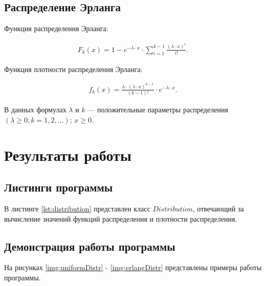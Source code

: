 \documentclass{bmstu}
\begin{document}
\section{Распределение Эрланга}

Функция распределения Эрланга:

\begin{equation}
    \begin{aligned}
        F_k(x) = 1 - e^{-\lambda \cdot x} \cdot \sum_{i = 1}^{k - 1} \frac{(\lambda \cdot x)^i}{i!}.
    \end{aligned}
\end{equation}


Функция плотности распределения Эрланга:

\begin{equation}
    \begin{aligned}
        f_k(x) = \frac{\lambda \cdot (\lambda \cdot x)^{k - 1}}{(k - 1)!} \cdot e^{-\lambda \cdot x}.
    \end{aligned}
\end{equation}

В данных формулах $\lambda$ и $k$ --- положительные параметры распределения $(\lambda \geqslant 0; k = 1, 2, ...)$;
$x \geqslant 0$.

\chapter{Результаты работы}

\section{Листинги программы}

В листинге \ref{lst:distribution} представлен класс $Distribution$, отвечающий за вычисление значений функций распределения и плотности распределения.


\section{Демонстрация работы программы}

На рисунках \ref{img:uniformDistr} - \ref{img:erlangDistr} представлены примеры работы программы.


\end{document}
